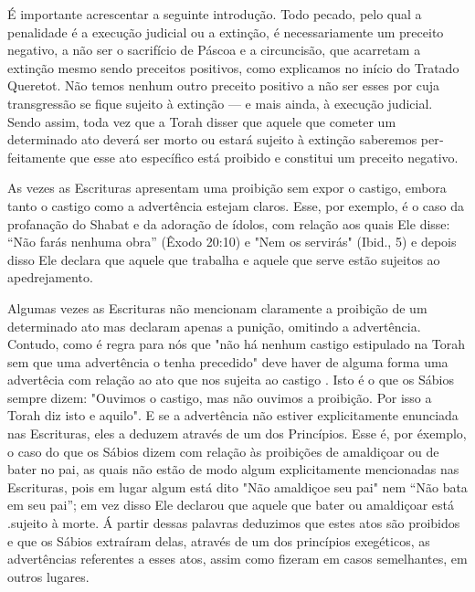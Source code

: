 É importante acrescentar a seguinte introdução. Todo pecado, pelo qual a
penalidade é a execução judicial ou a extinção, é necessariamente um
preceito negativo, a não ser o sacrifício de Páscoa e a circuncisão, que
acarre­tam a extinção mesmo sendo preceitos positivos, como explicamos
no início do Tratado Queretot. Não temos nenhum outro preceito positivo
a não ser es­ses por cuja transgressão se fique sujeito à extinção --- e
mais ainda, à execução judicial. Sendo assim, toda vez que a Torah
disser que aquele que cometer um determinado ato deverá ser morto ou
estará sujeito à extinção saberemos per­feitamente que esse ato
específico está proibido e constitui um preceito negativo.

As vezes as Escrituras apresentam uma proibição sem expor o casti­go,
embora tanto o castigo como a advertência estejam claros. Esse, por
exem­plo, é o caso da profanação do Shabat e da adoração de ídolos, com
relação aos quais Ele disse: ``Não farás nenhuma obra'' (Êxodo 20:10) e
"Nem os servi­rás" (Ibid., 5) e depois disso Ele declara que aquele que
trabalha e aquele que serve estão sujeitos ao apedrejamento.

Algumas vezes as Escrituras não mencionam claramente a proibição de um
determinado ato mas declaram apenas a punição, omitindo a advertên­cia.
Contudo, como é regra para nós que "não há nenhum castigo estipulado na
Torah sem que uma advertência o tenha precedido" deve haver de alguma
forma uma advertêcia com relação ao ato que nos sujeita ao castigo .
Isto é o que os Sábios sempre dizem: "Ouvimos o castigo, mas não ouvimos
a proibi­ção. Por isso a Torah diz isto e aquilo". E se a advertência
não estiver explicita­mente enunciada nas Escrituras, eles a deduzem
através de um dos Princípios. Esse é, por éxemplo, o caso do que os
Sábios dizem com relação às proibições de amaldiçoar ou de bater no pai,
as quais não estão de modo algum explicita­mente mencionadas nas
Escrituras, pois em lugar algum está dito "Não amaldi­çoe seu pai" nem
``Não bata em seu pai''; em vez disso Ele declarou que aquele que bater ou
amaldiçoar está .sujeito à morte. Á partir dessas palavras deduzi­mos
que estes atos são proibidos e que os Sábios extraíram delas, através de
um dos princípios exegéticos, as advertências referentes a esses atos,
assim co­mo fizeram em casos semelhantes, em outros lugares.

